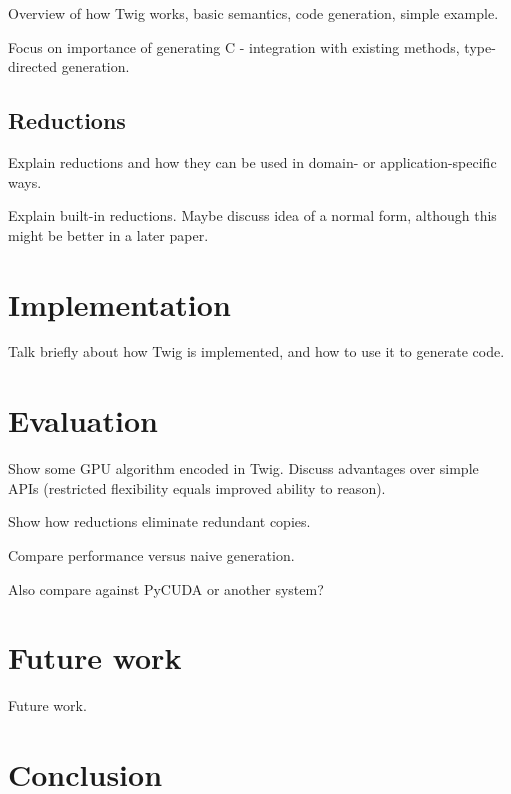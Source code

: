\documentclass[11pt]{article}
\begin{document}
Overview of how Twig works, basic semantics, code generation, simple example.

Focus on importance of generating C - integration with existing methods, type-directed generation.

\subsection{Reductions}

Explain reductions and how they can be used in domain- or application-specific
ways.

Explain built-in reductions. Maybe discuss idea of a normal form, although
this might be better in a later paper.

\section{Implementation}

Talk briefly about how Twig is implemented, and how to use it to generate
code.

\section{Evaluation}

Show some GPU algorithm encoded in Twig. Discuss advantages over simple APIs
(restricted flexibility equals improved ability to reason).

Show how reductions eliminate redundant copies.

Compare performance versus naive generation.

Also compare against PyCUDA or another system?

\section{Future work}

Future work.

\section{Conclusion}


% 

% 
% 
\end{document}
